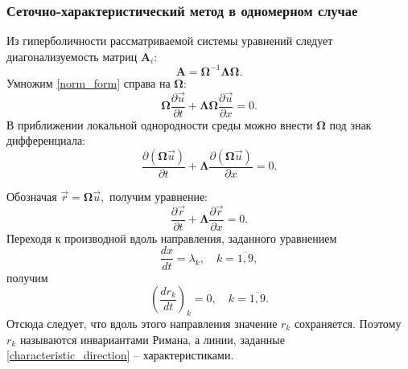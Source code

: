 \subsubsection{Сеточно-характеристический метод в одномерном случае}
Из гиперболичности рассматриваемой системы уравнений следует диагонализуемость матриц $\mathbf{A}_i$:
\begin{equation}
	\label{diagonal_view}
	\mathbf{A} = \mathbf{\Omega}^{-1}\mathbf{\Lambda}\mathbf{\Omega}.
\end{equation}	
Умножим \eqref{norm_form} справа на $\mathbf{\Omega}$:
\begin{equation}
	\label{norm_form1}
	\mathbf{\Omega}\frac{\partial\vec{u}}{\partial{t}}+\mathbf{\Lambda}\mathbf{\Omega}\frac{\partial\vec{u}}{\partial{x}} = 0.
\end{equation}
В приближении локальной однородности среды можно внести $\mathbf{\Omega}$ под знак дифференциала:
\begin{equation}
	\label{norm_form2}
	\frac{\partial(\mathbf{\Omega}\vec{u})}{\partial{t}}+\mathbf{\Lambda}\frac{\partial(\mathbf{\Omega}\vec{u})}{\partial{x}} = 0.
\end{equation}
	
Обозначая $\vec{r} = \mathbf{\Omega}\vec{u},$ получим уравнение:
\begin{equation}
	\label{Riman_invariantes}
	\frac{\partial\vec{r}}{\partial{t}}+\mathbf{\Lambda}\frac{\partial\vec{r}}{\partial{x}} = 0.
\end{equation}
Переходя к производной вдоль направления, заданного уравнением
\begin{equation}
	\label{characteristic_direction}
	\frac{dx}{dt} = \lambda_k, \quad k = \overline{1, 9},
\end{equation}
получим
\begin{equation}
	\label{Riman_invariantes1}
	\left(\frac{dr_k}{dt}\right)_k = 0, \quad k = \overline{1, 9}.
\end{equation}
Отсюда следует, что вдоль этого направления значение $r_k$ сохраняется. Поэтому $r_k$ называются инвариантами Римана, а линии, заданные \eqref{characteristic_direction} -- характеристиками.


